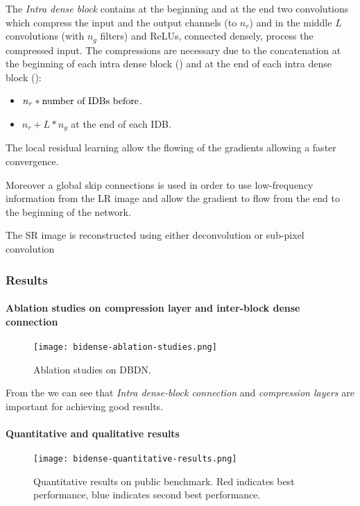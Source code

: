 The \textit{Intra dense block} contains at the beginning and at the end two convolutions which compress the input and the output channels (to $n_r$) and in the middle $L$ convolutions (with $n_g$ filters) and ReLUs, connected densely, process the compressed input.
The compressions are necessary due to the concatenation at the beginning of each intra dense block () and at the end of each intra dense block ():
\begin{itemize}
    \item $n_r \ast \textnormal{number of IDBs before}$.
    \item $n_r + L \ast n_g$ at the end of each IDB. 
\end{itemize}
The local residual learning allow the flowing of the gradients allowing a faster convergence.

Moreover a global skip connections is used in order to use low-frequency information from the LR image and allow the gradient to flow from the end to the beginning of the network.

The SR image is reconstructed using either deconvolution or sub-pixel convolution\cite{subpixel}

\subsubsection{Results}

\paragraph{Ablation studies on compression layer and inter-block dense connection}
\begin{figure}
    \centering
    \texttt{[image: bidense-ablation-studies.png]}
    \caption{Ablation studies on DBDN.}\label{dbdn-ablation-studies}
\end{figure}
From the  we can see that \textit{Intra dense-block connection} and \textit{compression layers} are important for achieving good results. 

\paragraph{Quantitative and qualitative results}
\begin{figure}
    \centering
    \texttt{[image: bidense-quantitative-results.png]}
    \caption{Quantitative results on public benchmark. Red indicates best performance, blue indicates second best performance.}\label{dbdn:quantitative}
\end{figure}

